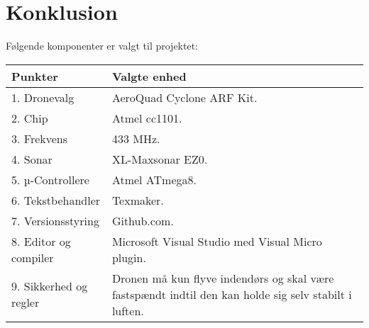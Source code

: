 \documentclass[Main]{subfiles}
\begin{document}
\chapter{Konklusion}
Følgende komponenter er valgt til projektet:\\

\begin{tabular}{p{} p{}}
\hline
Punkter & Valgte enhed \\ \hline
1. Dronevalg & AeroQuad Cyclone ARF Kit. \\
2. Chip & Atmel cc1101.\\
3. Frekvens & 433 MHz.\\
4. Sonar & XL-Maxsonar EZ0.\\
5. µ-Controllere & Atmel ATmega8.\\
6. Tekstbehandler & Texmaker.\\
7. Versionsstyring & Github.com.\\
8. Editor og compiler & Microsoft Visual Studio med Visual Micro plugin.\\
9. Sikkerhed og regler & Dronen må kun flyve indendørs og skal være fastspændt indtil den kan holde sig selv stabilt i luften.\\ \hline
\end{tabular}
\end{document}
